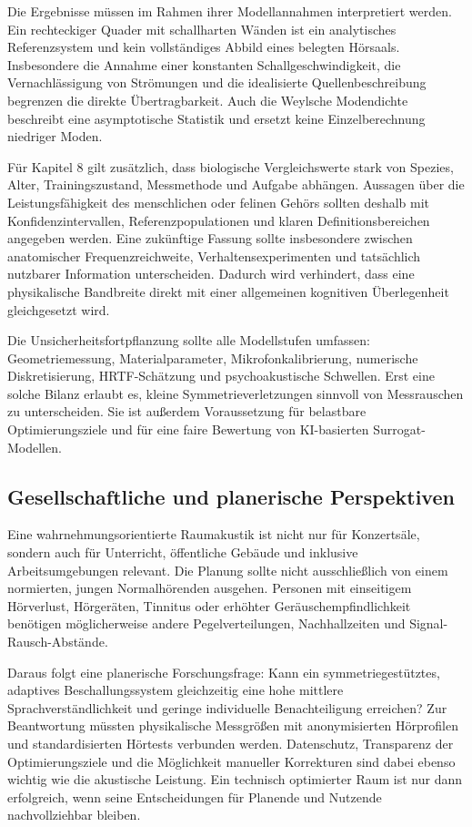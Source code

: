 ﻿\documentclass[12pt, a4paper]{article}
\theoremstyle{definition}
\theoremstyle{remark}
\begin{document}
Die Ergebnisse müssen im Rahmen ihrer Modellannahmen interpretiert werden. Ein
rechteckiger Quader mit schallharten Wänden ist ein analytisches Referenzsystem und
kein vollständiges Abbild eines belegten Hörsaals. Insbesondere die Annahme einer
konstanten Schallgeschwindigkeit, die Vernachlässigung von Strömungen und die
idealisierte Quellenbeschreibung begrenzen die direkte Übertragbarkeit. Auch die
Weylsche Modendichte beschreibt eine asymptotische Statistik und ersetzt keine
Einzelberechnung niedriger Moden.

Für Kapitel 8 gilt zusätzlich, dass biologische Vergleichswerte stark von Spezies,
Alter, Trainingszustand, Messmethode und Aufgabe abhängen. Aussagen über die
Leistungsfähigkeit des menschlichen oder felinen Gehörs sollten deshalb mit
Konfidenzintervallen, Referenzpopulationen und klaren Definitionsbereichen angegeben
werden. Eine zukünftige Fassung sollte insbesondere zwischen anatomischer
Frequenzreichweite, Verhaltensexperimenten und tatsächlich nutzbarer Information
unterscheiden. Dadurch wird verhindert, dass eine physikalische Bandbreite direkt
mit einer allgemeinen kognitiven Überlegenheit gleichgesetzt wird.

Die Unsicherheitsfortpflanzung sollte alle Modellstufen umfassen: Geometriemessung,
Materialparameter, Mikrofonkalibrierung, numerische Diskretisierung, HRTF-Schätzung
und psychoakustische Schwellen. Erst eine solche Bilanz erlaubt es, kleine
Symmetrieverletzungen sinnvoll von Messrauschen zu unterscheiden. Sie ist außerdem
Voraussetzung für belastbare Optimierungsziele und für eine faire Bewertung von
KI-basierten Surrogat-Modellen.

\subsection{Gesellschaftliche und planerische Perspektiven}

Eine wahrnehmungsorientierte Raumakustik ist nicht nur für Konzertsäle, sondern auch
für Unterricht, öffentliche Gebäude und inklusive Arbeitsumgebungen relevant. Die
Planung sollte nicht ausschließlich von einem normierten, jungen Normalhörenden
ausgehen. Personen mit einseitigem Hörverlust, Hörgeräten, Tinnitus oder erhöhter
Geräuschempfindlichkeit benötigen möglicherweise andere Pegelverteilungen,
Nachhallzeiten und Signal-Rausch-Abstände.

Daraus folgt eine planerische Forschungsfrage: Kann ein symmetriegestütztes,
adaptives Beschallungssystem gleichzeitig eine hohe mittlere Sprachverständlichkeit
und geringe individuelle Benachteiligung erreichen? Zur Beantwortung müssten
physikalische Messgrößen mit anonymisierten Hörprofilen und standardisierten
Hörtests verbunden werden. Datenschutz, Transparenz der Optimierungsziele und die
Möglichkeit manueller Korrekturen sind dabei ebenso wichtig wie die akustische
Leistung. Ein technisch optimierter Raum ist nur dann erfolgreich, wenn seine
Entscheidungen für Planende und Nutzende nachvollziehbar bleiben.
\end{document}
